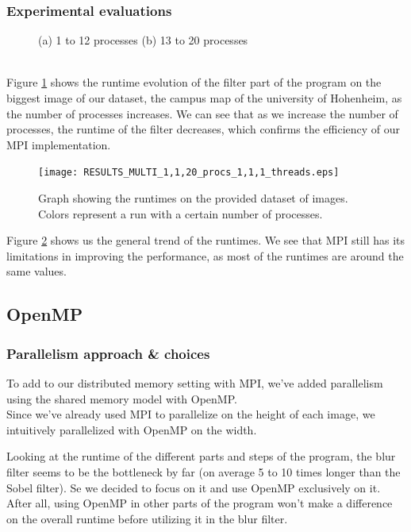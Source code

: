 \documentclass[11pt]{article}
\begin{document}
\subsubsection{Experimental evaluations}
\begin{figure}[h]
	\centering
	\caption{(a) 1 to 12 processes (b) 13 to 20 processes}
	\label{fig:MPIeval}
\end{figure} \\
Figure \ref{fig:MPIeval} shows the runtime evolution of the filter part of the program on the biggest image of our dataset, the campus map of the university of Hohenheim, as the number of processes increases. We can see that as we increase the number of processes, the runtime of the filter decreases, which confirms the efficiency of our MPI implementation.\\
\begin{figure}[h]
	\centering
	\texttt{[image: RESULTS\_MULTI\_1,1,20\_procs\_1,1,1\_threads.eps]}
	\caption{Graph showing the runtimes on the provided dataset of images. Colors represent a run with a certain number of processes.}
	\label{fig:MPIevalGraph}
\end{figure}
Figure \ref{fig:MPIevalGraph} shows us the general trend of the runtimes. We see that MPI still has its limitations in improving the performance, as most of the runtimes are around the same values.

\newpage

\subsection{OpenMP}
\subsubsection{Parallelism approach & choices}
To add to our distributed memory setting with MPI, we've added parallelism using the shared memory model with OpenMP. \\
Since we've already used MPI to parallelize on the  height of each image, we intuitively parallelized with OpenMP on the width.

Looking at the runtime of the different parts and steps of the program, the blur filter seems to be the bottleneck by far (on average 5 to 10 times longer than the Sobel filter). Se we decided to focus on it and use OpenMP exclusively on it. After all, using OpenMP in other parts of the program won't make a difference on the overall runtime before utilizing it in the blur filter. 
\end{document}

